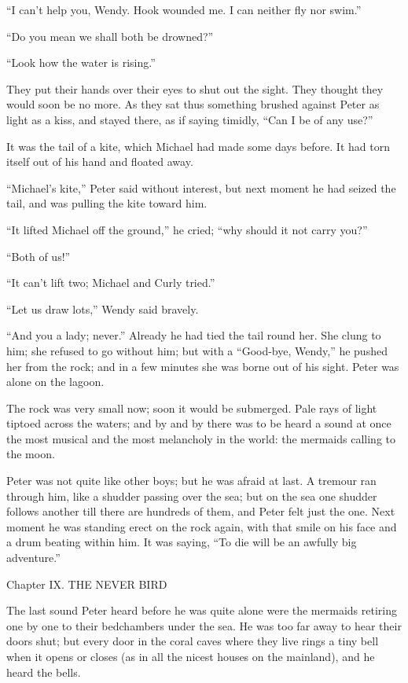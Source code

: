 ``I can't help you, Wendy. Hook wounded me. I can neither fly nor swim.''

``Do you mean we shall both be drowned?''

``Look how the water is rising.''

They put their hands over their eyes to shut out the sight. They
thought they would soon be no more. As they sat thus something brushed
against Peter as light as a kiss, and stayed there, as if saying
timidly, ``Can I be of any use?''

It was the tail of a kite, which Michael had made some days before. It
had torn itself out of his hand and floated away.

``Michael's kite,'' Peter said without interest, but next moment he had
seized the tail, and was pulling the kite toward him.

``It lifted Michael off the ground,'' he cried; ``why should it not carry
you?''

``Both of us!''

``It can't lift two; Michael and Curly tried.''

``Let us draw lots,'' Wendy said bravely.

``And you a lady; never.'' Already he had tied the tail round her. She
clung to him; she refused to go without him; but with a ``Good-bye,
Wendy,'' he pushed her from the rock; and in a few minutes she was borne
out of his sight. Peter was alone on the lagoon.

The rock was very small now; soon it would be submerged. Pale rays of
light tiptoed across the waters; and by and by there was to be heard a
sound at once the most musical and the most melancholy in the world:
the mermaids calling to the moon.

Peter was not quite like other boys; but he was afraid at last. A
tremour ran through him, like a shudder passing over the sea; but on
the sea one shudder follows another till there are hundreds of them,
and Peter felt just the one. Next moment he was standing erect on the
rock again, with that smile on his face and a drum beating within him.
It was saying, ``To die will be an awfully big adventure.''




Chapter IX.
THE NEVER BIRD


The last sound Peter heard before he was quite alone were the mermaids
retiring one by one to their bedchambers under the sea. He was too far
away to hear their doors shut; but every door in the coral caves where
they live rings a tiny bell when it opens or closes (as in all the
nicest houses on the mainland), and he heard the bells.

